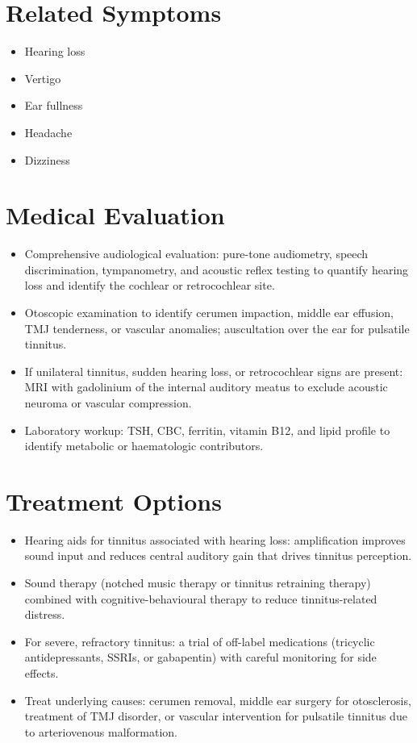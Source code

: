 \section*{Related Symptoms}
\begin{itemize}
  \item Hearing loss
  \item Vertigo
  \item Ear fullness
  \item Headache
  \item Dizziness
\end{itemize}

\section*{Medical Evaluation}
\begin{itemize}
  \item Comprehensive audiological evaluation: pure-tone audiometry, speech discrimination, tympanometry, and acoustic reflex testing to quantify hearing loss and identify the cochlear or retrocochlear site.
  \item Otoscopic examination to identify cerumen impaction, middle ear effusion, TMJ tenderness, or vascular anomalies; auscultation over the ear for pulsatile tinnitus.
  \item If unilateral tinnitus, sudden hearing loss, or retrocochlear signs are present: MRI with gadolinium of the internal auditory meatus to exclude acoustic neuroma or vascular compression.
  \item Laboratory workup: TSH, CBC, ferritin, vitamin B12, and lipid profile to identify metabolic or haematologic contributors.
\end{itemize}

\section*{Treatment Options}
\begin{itemize}
  \item Hearing aids for tinnitus associated with hearing loss: amplification improves sound input and reduces central auditory gain that drives tinnitus perception.
  \item Sound therapy (notched music therapy or tinnitus retraining therapy) combined with cognitive-behavioural therapy to reduce tinnitus-related distress.
  \item For severe, refractory tinnitus: a trial of off-label medications (tricyclic antidepressants, SSRIs, or gabapentin) with careful monitoring for side effects.
  \item Treat underlying causes: cerumen removal, middle ear surgery for otosclerosis, treatment of TMJ disorder, or vascular intervention for pulsatile tinnitus due to arteriovenous malformation.
\end{itemize}

